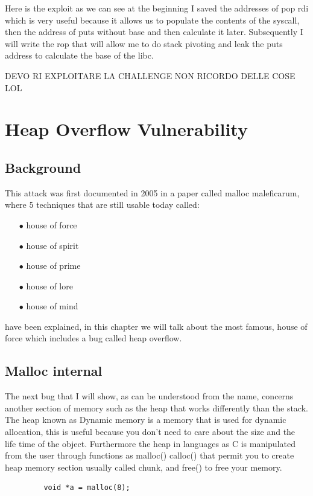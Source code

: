 \documentclass{report}
\begin{document}
    Here is the exploit as we can see at the beginning I saved the addresses of pop rdi which is very useful because it allows us to populate the contents of the syscall, then the address of puts without base and then calculate it later.\newline
    Subsequently I will write the rop that will allow me to do stack pivoting and leak the puts address to calculate the base of the libc.\newline

    DEVO RI EXPLOITARE LA CHALLENGE NON RICORDO DELLE COSE LOL

    \clearpage
    \chapter{Heap Overflow Vulnerability}
    \section{Background}
        This attack was first documented in 2005 in a paper called malloc maleficarum, where 5 techniques that are still usable today called: 
       \begin{itemize}
        \item[$\bullet$] house of force
        \item[$\bullet$] house of spirit
        \item[$\bullet$] house of prime  
        \item[$\bullet$] house of lore 
        \item[$\bullet$] house of mind
    \end{itemize}

    have been explained, in this chapter we will talk about the most famous, house of force which includes a bug called heap overflow.
    \clearpage
    
    \section{Malloc internal}
    The next bug that I will show, as can be understood from the name, concerns another section of memory such as the heap that works differently than the stack.\newline
    The heap known as Dynamic memory is a memory that is used for dynamic allocation, this is useful because you don't need to care about the size and the life time of the object. \newline
    Furthermore the heap in languages as C is manipulated from the user through functions as malloc() calloc() that permit you to create heap memory section usually called chunk, and free() to free your memory.\newline
     \begin{verbatim}
         void *a = malloc(8);
     \end{verbatim}
\end{document}
